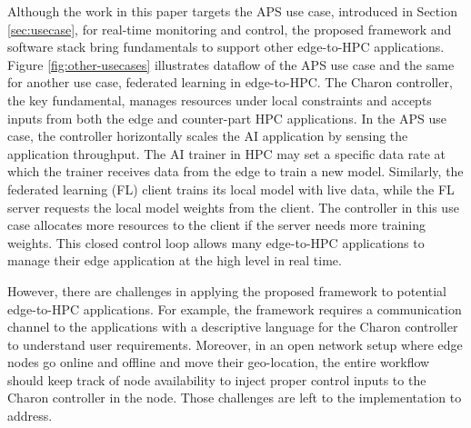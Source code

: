 Although the work in this paper targets the APS use case, introduced in Section \ref{sec:usecase}, for real-time monitoring and control, the proposed framework and software stack bring fundamentals to support other edge-to-HPC applications. Figure \ref{fig:other-usecases} illustrates dataflow of the APS use case and the same for another use case, federated learning in edge-to-HPC. The Charon controller, the key fundamental, manages resources under local constraints and accepts inputs from both the edge and counter-part HPC applications. In the APS use case, the controller horizontally scales the AI application by sensing the application throughput. The AI trainer in HPC may set a specific data rate at which the trainer receives data from the edge to train a new model. Similarly, the federated learning (FL) client trains its local model with live data, while the FL server requests the local model weights from the client. The controller in this use case allocates more resources to the client if the server needs more training weights. This closed control loop allows many edge-to-HPC applications to manage their edge application at the high level in real time.

However, there are challenges in applying the proposed framework to potential edge-to-HPC applications. For example, the framework requires a communication channel to the applications with a descriptive language for the Charon controller to understand user requirements. Moreover, in an open network setup where edge nodes go online and offline and move their geo-location, the entire workflow should keep track of node availability to inject proper control inputs to the Charon controller in the node. Those challenges are left to the implementation to address.



